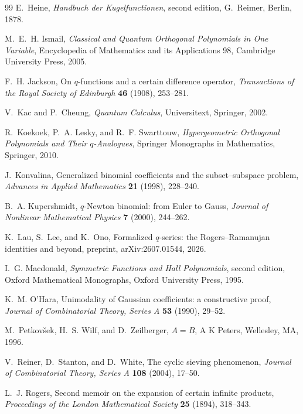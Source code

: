 \documentclass[11pt,a4paper,oneside,openany]{book}
\theoremstyle{definition}
\theoremstyle{remark}
\begin{document}
\begin{thebibliography}{99}
E.~Heine,
\emph{Handbuch der Kugelfunctionen}, second edition,
G.~Reimer, Berlin, 1878.

M.~E.~H. Ismail,
\emph{Classical and Quantum Orthogonal Polynomials in One Variable},
Encyclopedia of Mathematics and its Applications 98, Cambridge University Press, 2005.

F.~H. Jackson,
On $q$-functions and a certain difference operator,
\emph{Transactions of the Royal Society of Edinburgh} \textbf{46} (1908), 253--281.

V.~Kac and P.~Cheung,
\emph{Quantum Calculus},
Universitext, Springer, 2002.

R.~Koekoek, P.~A. Lesky, and R.~F. Swarttouw,
\emph{Hypergeometric Orthogonal Polynomials and Their $q$-Analogues},
Springer Monographs in Mathematics, Springer, 2010.

J.~Konvalina,
Generalized binomial coefficients and the subset--subspace problem,
\emph{Advances in Applied Mathematics} \textbf{21} (1998), 228--240.

B.~A. Kupershmidt,
$q$-Newton binomial: from Euler to Gauss,
\emph{Journal of Nonlinear Mathematical Physics} \textbf{7} (2000), 244--262.

K.~Lau, S.~Lee, and K.~Ono,
Formalized $q$-series: the Rogers--Ramanujan identities and beyond,
preprint, arXiv:2607.01544, 2026.

I.~G. Macdonald,
\emph{Symmetric Functions and Hall Polynomials}, second edition,
Oxford Mathematical Monographs, Oxford University Press, 1995.

K.~M. O'Hara,
Unimodality of Gaussian coefficients: a constructive proof,
\emph{Journal of Combinatorial Theory, Series A} \textbf{53} (1990), 29--52.

M.~Petkov\v{s}ek, H.~S. Wilf, and D.~Zeilberger,
\emph{$A=B$},
A K Peters, Wellesley, MA, 1996.

V.~Reiner, D.~Stanton, and D.~White,
The cyclic sieving phenomenon,
\emph{Journal of Combinatorial Theory, Series A} \textbf{108} (2004), 17--50.

L.~J. Rogers,
Second memoir on the expansion of certain infinite products,
\emph{Proceedings of the London Mathematical Society} \textbf{25} (1894), 318--343.


\end{thebibliography}
\end{document}

